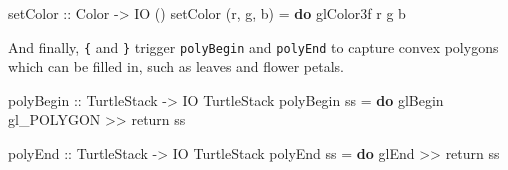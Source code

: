 \documentclass[]{article}
\newenvironment{Shaded}{}{}
\newcommand{\KeywordTok}[1]{\textcolor[rgb]{0.00,0.44,0.13}{\textbf{{#1}}}}
\newcommand{\DataTypeTok}[1]{\textcolor[rgb]{0.56,0.13,0.00}{{#1}}}
\newcommand{\DecValTok}[1]{\textcolor[rgb]{0.25,0.63,0.44}{{#1}}}
\newcommand{\FloatTok}[1]{\textcolor[rgb]{0.25,0.63,0.44}{{#1}}}
\newcommand{\OtherTok}[1]{\textcolor[rgb]{0.00,0.44,0.13}{{#1}}}
\newcommand{\FunctionTok}[1]{\textcolor[rgb]{0.02,0.16,0.49}{{#1}}}
\newcommand{\NormalTok}[1]{{#1}}
\begin{document}
\begin{Shaded}
\end{Shaded}
\begin{Shaded}
\begin{Highlighting}[]
\OtherTok{setColor           ::} \DataTypeTok{Color} \OtherTok{->} \DataTypeTok{IO} \NormalTok{()}
\NormalTok{setColor (r, g, b)  }\FunctionTok{=} \KeywordTok{do}
  \NormalTok{glColor3f r g b}
\end{Highlighting}
\end{Shaded}
\begin{Shaded}
\end{Shaded}
And finally, \texttt{\{} and \texttt{\}} trigger \texttt{polyBegin} and
\texttt{polyEnd} to capture convex polygons which can be filled in, such
as leaves and flower petals.

\begin{Shaded}
\begin{Highlighting}[]
\OtherTok{polyBegin                            ::} \DataTypeTok{TurtleStack} \OtherTok{->} \DataTypeTok{IO} \DataTypeTok{TurtleStack}
\NormalTok{polyBegin ss                          }\FunctionTok{=} \KeywordTok{do}
  \NormalTok{glBegin gl_POLYGON }\FunctionTok{>>} \FunctionTok{return} \NormalTok{ss}
\end{Highlighting}
\end{Shaded}
\begin{Shaded}
\begin{Highlighting}[]
\OtherTok{polyEnd                              ::} \DataTypeTok{TurtleStack} \OtherTok{->} \DataTypeTok{IO} \DataTypeTok{TurtleStack}
\NormalTok{polyEnd ss                            }\FunctionTok{=} \KeywordTok{do}
  \NormalTok{glEnd }\FunctionTok{>>} \FunctionTok{return} \NormalTok{ss}
\end{Highlighting}
\end{Shaded}
\end{document}
